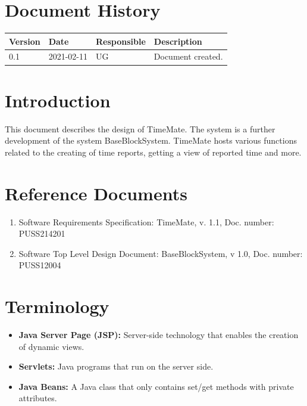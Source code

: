 \documentclass{article}
\date {#1}
\title {
    \documentNumber {01}    
    
    \documentVersion {0.3}
    
    \documentTitle {Software Top Level Design Document}
    \documentGroup {2}
    
    \documentResponsible {System Group}
    \documentAuthors {Developer Group}
    
    \documentDate {2021-02-18}
}
\begin{document}
\maketitle
\thispagestyle{empty}

\newpage

\tableofcontents

\newpage


\section{Document History}
\begin{tabular}{ l | l | l | l }
    Version & Date & Responsible & Description \\
    \hline
    0.1 & 2021-02-11 & UG & Document created. \\
\end{tabular}

\section{Introduction}
This document describes the design of TimeMate. The system is a further development of the system BaseBlockSystem. TimeMate hosts various functions related to the creating of time reports, getting a view of reported time and more.

\section{Reference Documents}
\begin{enumerate}
    \item Software Requirements Specification: TimeMate, v. 1.1, Doc. number: PUSS214201
    \item Software Top Level Design Document: BaseBlockSystem, v 1.0, Doc. number: PUSS12004
\end{enumerate}

\section{Terminology}
\begin{itemize}
\item \textbf{Java Server Page (JSP):} Server-side technology that enables the creation of dynamic views.
\item \textbf{Servlets:} Java programs that run on the server side.
\item \textbf{Java Beans:} A Java class that only contains set/get methods with private attributes.
\end{itemize}
\end{document}
